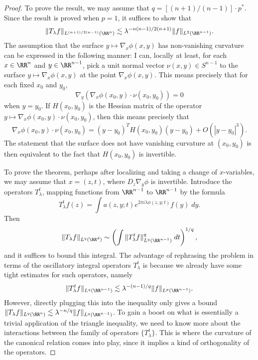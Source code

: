 \begin{proof}
    To prove the result, we may assume that $q = [(n+1)/(n-1)] \cdot p^*$. Since the result is proved when $p = 1$, it suffices to show that
    \[ \| T_\lambda f \|_{L^{(n+1)/2(n-1)}(\RR^n)} \lesssim \lambda^{-n(n-1)/2(n+1)} \| f \|_{L^2(\RR^{n-1})}. \]
    The assumption that the surface $y \mapsto \nabla_x \phi(x,y)$ has non-vanishing curvature can be expressed in the following manner: I can, locally at least, for each $x \in \RR^n$ and $y \in \RR^{n-1}$, pick a unit normal vector $\nu(x,y) \in S^{n-1}$ to the surface $y \mapsto \nabla_x \phi(x,y)$ at the point $\nabla_x \phi(x,y)$. This means precisely that for each fixed $x_0$ and $y_0$,
    \[ \nabla_y (\nabla_x \phi(x_0,y) \cdot \nu(x_0,y_0)) = 0 \]
    when $y = y_0$. If $H(x_0,y_0)$ is the Hessian matrix of the operator $y \mapsto \nabla_x \phi(x_0,y) \cdot \nu(x_0,y_0)$, then this means precisely that
    \[ \nabla_x \phi(x_0,y) \cdot \nu(x_0,y_0) = (y - y_0)^T H(x_0,y_0) (y - y_0) + O(|y - y_0|^3). \] 
    The statement that the surface does not have vanishing curvature at $(x_0,y_0)$ is then equivalent to the fact that $H(x_0,y_0)$ is invertible.

    To prove the theorem, perhaps after localizing and taking a change of $x$-variables, we may assume that $x = (z,t)$, where $D_z \nabla_y \phi$ is invertible. Introduce the operators $T_\lambda^t$, mapping functions from $\RR^{n-1}$ to $\RR^{n-1}$ by the formula
    \[ T_\lambda^t f(z) = \int a(z,y;t) e^{2 \pi i \lambda \phi(z,y;t)} f(y)\; dy. \]
    Then
    \[ \| T_\lambda f \|_{L^q(\RR^d)} \sim \left( \int \| T^t_\lambda f \|_{L^q(\RR^{n-1})}^q\; dt \right)^{1/q}, \]
    and it suffices to bound this integral. The advantage of rephrasing the problem in terms of the oscillatory integral operators $T_\lambda^t$ is because we already have some tight estimates for such operators, namely
    \[ \| T^t_\lambda f \|_{L^q(\RR^{n-1})} \lesssim \lambda^{-(n-1)/q} \| f \|_{L^p(\RR^{n-1})}. \]
    However, directly plugging this into the inequality only gives a bound $\| T_\lambda f \|_{L^q(\RR^n)} \lesssim \lambda^{-n/q} \| f \|_{L^q(\RR^{n-1})}$. To gain a boost on what is essentially a trivial application of the triangle inequality, we need to know more about the interactions between the family of operators $\{ T^t_\lambda \}$. This is where the curvature of the canonical relation comes into play, since it implies a kind of orthogonality of the operators.


\end{proof}
